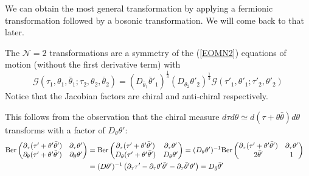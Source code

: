 \documentclass[aps,pre,preprint,onecolumn,citeautoscript,superscriptaddress,nofootinbib,eqsecnum]{revtex4-1}
\begin{document}
We can obtain the most general transformation by applying a fermionic transformation followed by a bosonic transformation.
We will come back to that later. 

The $\mathcal{N}=2$ transformations are a symmetry of the (\ref{EOMN2}) equations of motion (without the first derivative term)
with 
\begin{equation}
\mathcal{G}(\tau_1,\theta_1, \bar \theta_1;\tau_2,\theta_2, \bar \theta_2) = (D_{\bar \theta_1} \bar \theta'_1)^{\frac13} (D_{\theta_2} \theta'_2)^{\frac13} \mathcal{G}(\tau'_1,\theta'_1;\tau'_2,\theta'_2)
\end{equation}
Notice that the Jacobian factors are chiral and anti-chiral respectively. 

This follows from the observation that the chiral measure $d\tau d\theta\simeq d (\tau + \theta \bar \theta) d \theta$ transforms with a factor of $D_{\theta} \theta'$:
\begin{align}
\mathrm{Ber} \begin{pmatrix}\partial_\tau (\tau' + \theta' \bar \theta') &  \partial_\tau \theta'  \cr \partial_\theta (\tau' + \theta' \bar \theta') & \partial_\theta \theta'  \end{pmatrix} 
&= \mathrm{Ber} \begin{pmatrix}\partial_\tau (\tau' + \theta' \bar \theta')   & \partial_\tau \theta'  \cr D_\theta (\tau' + \theta' \bar \theta')   &  D_\theta \theta' \end{pmatrix} 
= (D_\theta\theta')^{-1} \mathrm{Ber} \begin{pmatrix}\partial_\tau (\tau' + \theta' \bar \theta')  & \partial_\tau \theta'  \cr 2 \bar \theta'  &  1\end{pmatrix}\cr 
&= (D\theta')^{-1}\left( \partial_\tau \tau'  - \partial_\tau \theta' \bar \theta' -\partial_\tau \bar \theta' \theta'    \right) = D_{\bar \theta} \bar \theta'
\end{align}
\end{document}

